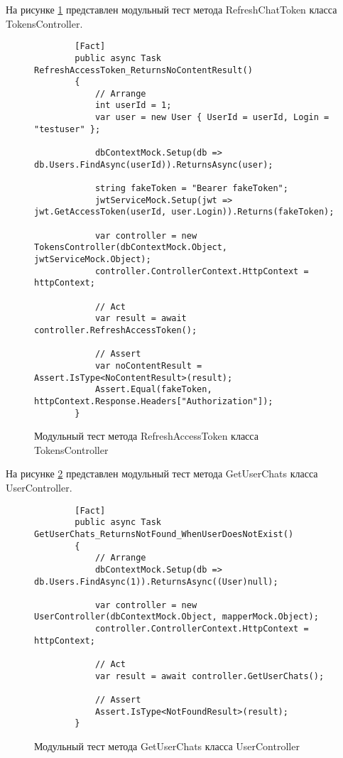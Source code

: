На рисунке \ref{unitRefreshChatToken:image} представлен модульный тест метода RefreshChatToken класса TokensController.

\begin{figure}[H]
	\begin{lstlisting}
		[Fact]
		public async Task RefreshAccessToken_ReturnsNoContentResult()
		{
			// Arrange
			int userId = 1;
			var user = new User { UserId = userId, Login = "testuser" };
			
			dbContextMock.Setup(db => db.Users.FindAsync(userId)).ReturnsAsync(user);
			
			string fakeToken = "Bearer fakeToken";
			jwtServiceMock.Setup(jwt => jwt.GetAccessToken(userId, user.Login)).Returns(fakeToken);
			
			var controller = new TokensController(dbContextMock.Object, jwtServiceMock.Object);
			controller.ControllerContext.HttpContext = httpContext;
			
			// Act
			var result = await controller.RefreshAccessToken();
			
			// Assert
			var noContentResult = Assert.IsType<NoContentResult>(result);
			Assert.Equal(fakeToken, httpContext.Response.Headers["Authorization"]);
		}
	\end{lstlisting}
	\caption{Модульный тест метода RefreshAccessToken класса TokensController}
	\label{unitRefreshChatToken:image}
\end{figure}

На рисунке \ref{unitGetUserChats:image} представлен модульный тест метода GetUserChats класса UserController.

\begin{figure}[H]
	\begin{lstlisting}
		[Fact]
		public async Task GetUserChats_ReturnsNotFound_WhenUserDoesNotExist()
		{
			// Arrange
			dbContextMock.Setup(db => db.Users.FindAsync(1)).ReturnsAsync((User)null);
			
			var controller = new UserController(dbContextMock.Object, mapperMock.Object);
			controller.ControllerContext.HttpContext = httpContext;
			
			// Act
			var result = await controller.GetUserChats();
			
			// Assert
			Assert.IsType<NotFoundResult>(result);
		}
	\end{lstlisting}
	\caption{Модульный тест метода GetUserChats класса UserController}
	\label{unitGetUserChats:image}
\end{figure}

